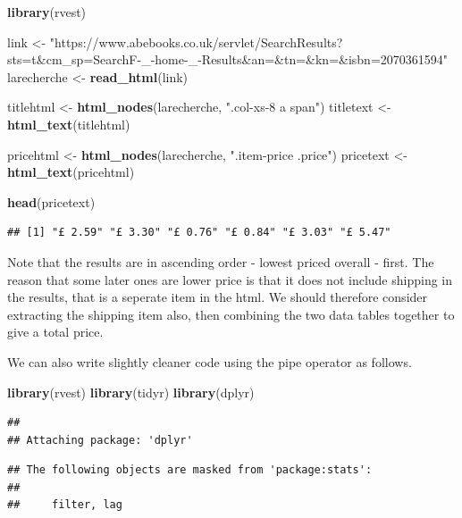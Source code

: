 \documentclass[]{book}
\newenvironment{Shaded}{\begin{snugshade}}{\end{snugshade}}
\newcommand{\KeywordTok}[1]{\textcolor[rgb]{0.13,0.29,0.53}{\textbf{#1}}}
\newcommand{\StringTok}[1]{\textcolor[rgb]{0.31,0.60,0.02}{#1}}
\newcommand{\NormalTok}[1]{#1}
\theoremstyle{definition}
\theoremstyle{definition}
\theoremstyle{definition}
\theoremstyle{remark}
\begin{document}
\begin{Shaded}
\begin{Highlighting}[]
\KeywordTok{library}\NormalTok{(rvest)}

\NormalTok{link <-}\StringTok{ "https://www.abebooks.co.uk/servlet/SearchResults?sts=t&cm_sp=SearchF-_-home-_-Results&an=&tn=&kn=&isbn=2070361594"}
\NormalTok{larecherche <-}\StringTok{ }\KeywordTok{read_html}\NormalTok{(link)}

\NormalTok{titlehtml <-}\StringTok{ }\KeywordTok{html_nodes}\NormalTok{(larecherche, }\StringTok{".col-xs-8 a span"}\NormalTok{)}
\NormalTok{titletext <-}\StringTok{ }\KeywordTok{html_text}\NormalTok{(titlehtml)}

\NormalTok{pricehtml <-}\StringTok{ }\KeywordTok{html_nodes}\NormalTok{(larecherche, }\StringTok{".item-price .price"}\NormalTok{)}
\NormalTok{pricetext <-}\StringTok{ }\KeywordTok{html_text}\NormalTok{(pricehtml)}

\KeywordTok{head}\NormalTok{(pricetext)}
\end{Highlighting}
\end{Shaded}

\begin{verbatim}
## [1] "£ 2.59" "£ 3.30" "£ 0.76" "£ 0.84" "£ 3.03" "£ 5.47"
\end{verbatim}

Note that the results are in ascending order - lowest priced overall -
first. The reason that some later ones are lower price is that it does
not include shipping in the results, that is a seperate item in the
html. We should therefore consider extracting the shipping item also,
then combining the two data tables together to give a total price.

We can also write slightly cleaner code using the pipe operator as
follows.

\begin{Shaded}
\begin{Highlighting}[]
\KeywordTok{library}\NormalTok{(rvest)}
\KeywordTok{library}\NormalTok{(tidyr)}
\KeywordTok{library}\NormalTok{(dplyr)}
\end{Highlighting}
\end{Shaded}

\begin{verbatim}
## 
## Attaching package: 'dplyr'
\end{verbatim}

\begin{verbatim}
## The following objects are masked from 'package:stats':
## 
##     filter, lag
\end{verbatim}
\end{document}
